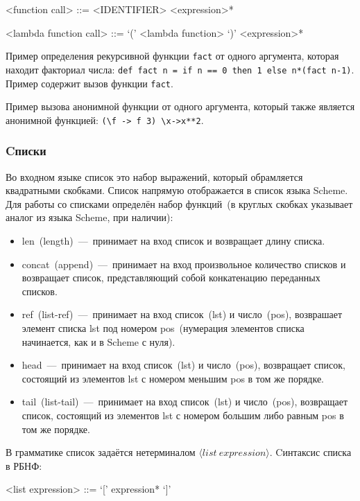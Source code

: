 \documentclass[12pt,a4paper,oneside]{extarticle}
\begin{document}
            \begin{grammar}
                <function call> ::= <IDENTIFIER> <expression>*

                <lambda function call> ::= `(' <lambda function> `)' <expression>*
            \end{grammar}

            Пример определения рекурсивной функции \lstinline$fact$ от одного аргумента, которая находит факториал числа: \lstinline$def fact n = if n == 0 then 1 else n*(fact n-1)$. Пример содержит вызов функции \lstinline$fact$.

            Пример вызова анонимной функции от одного аргумента, который также является анонимной функцией: \lstinline$(\f -> f 3) \x->x**2$.

        \subsubsection{Cписки}
            Во входном языке список это набор выражений, который обрамляется квадратными скобками.
            Список напрямую отображается в список языка Scheme.
            Для работы со списками определён набор функций~(в круглых скобках указывает аналог из языка Scheme, при наличии):
            \begin{itemize}
                \item len~(length)~---~принимает на вход список и возвращает длину списка.
                \item concat~(append)~---~принимает на вход произвольное количество списков и возвращает список, представляющий собой конкатенацию переданных списков.
                \item ref~(list-ref)~---~принимает на вход список~(lst) и число~(pos), возврашает элемент списка lst под номером pos~(нумерация элементов списка начинается, как и в Scheme с нуля).
                \item head~---~принимает на вход список~(lst) и число~(pos), возвращает список, состоящий из элементов lst с номером меньшим pos в том же порядке.
                \item tail~(list-tail)~---~принимает на вход список~(lst) и число~(pos), возвращает список, состоящий из элементов lst с номером большим либо равным pos в том же порядке.
            \end{itemize}

            В грамматике список задаётся нетерминалом $\langle list~expression \rangle$. Cинтаксис списка в РБНФ:
            \begin{grammar}
                <list expression> ::= `[' expression* `]'
            \end{grammar}
\end{document}
